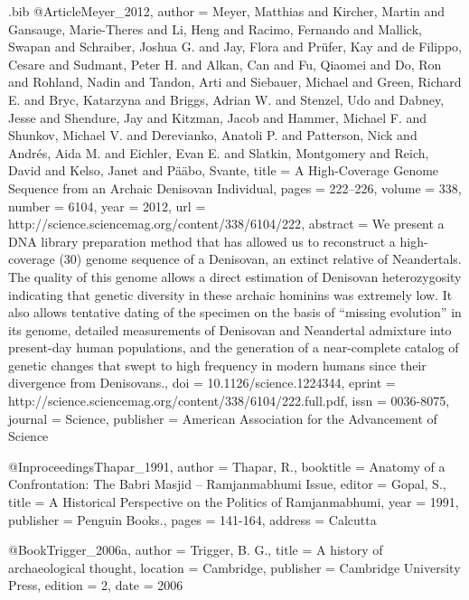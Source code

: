 \begin{filecontents}{\identifier.bib}
@Article{Meyer_2012,
  author =    {Meyer, Matthias and Kircher, Martin and Gansauge, Marie-Theres and Li, Heng and Racimo, Fernando and Mallick, Swapan and Schraiber, Joshua G. and Jay, Flora and Pr{\"u}fer, Kay and de Filippo, Cesare and Sudmant, Peter H. and Alkan, Can and Fu, Qiaomei and Do, Ron and Rohland, Nadin and Tandon, Arti and Siebauer, Michael and Green, Richard E. and Bryc, Katarzyna and Briggs, Adrian W. and Stenzel, Udo and Dabney, Jesse and Shendure, Jay and Kitzman, Jacob and Hammer, Michael F. and Shunkov, Michael V. and Derevianko, Anatoli P. and Patterson, Nick and Andr{\'e}s, Aida M. and Eichler, Evan E. and Slatkin, Montgomery and Reich, David and Kelso, Janet and P{\"a}{\"a}bo, Svante},
  title =     {A High-Coverage Genome Sequence from an Archaic Denisovan Individual},
  pages =     {222--226},
  volume =    {338},
  number =    {6104},
  year =      {2012},
  url =       {http://science.sciencemag.org/content/338/6104/222},
  abstract =  {We present a DNA library preparation method that has allowed us to reconstruct a high-coverage (30{\texttimes}) genome sequence of a Denisovan, an extinct relative of Neandertals. The quality of this genome allows a direct estimation of Denisovan heterozygosity indicating that genetic diversity in these archaic hominins was extremely low. It also allows tentative dating of the specimen on the basis of {\textquotedblleft}missing evolution{\textquotedblright} in its genome, detailed measurements of Denisovan and Neandertal admixture into present-day human populations, and the generation of a near-complete catalog of genetic changes that swept to high frequency in modern humans since their divergence from Denisovans.},
  doi =       {10.1126/science.1224344},
  eprint =    {http://science.sciencemag.org/content/338/6104/222.full.pdf},
  issn =      {0036-8075},
  journal =   {Science},
  publisher = {American Association for the Advancement of Science}
}

@Inproceedings{Thapar_1991,
  author =    {Thapar, R.},
  booktitle = {Anatomy of a Confrontation: The Babri Masjid – Ramjanmabhumi Issue},
  editor =    {Gopal, S.},
  title =     {A Historical Perspective on the Politics of Ramjanmabhumi},
  year =      {1991},
  publisher = {Penguin Books.},
  pages =     {141-164},
  address =   {Calcutta}
}

@Book{Trigger_2006a,
  author =    {Trigger, B. G.},
  title =     {A history of archaeological thought},
  location =  {Cambridge},
  publisher = {Cambridge University Press},
  edition =   {2},
  date =      {2006}
}


\end{filecontents}
